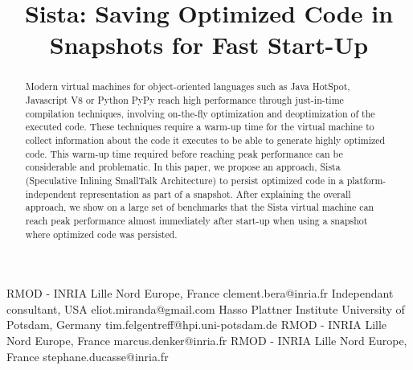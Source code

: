 \documentclass[preprint]{sigplanconf}
\begin{document}
\setlength{\pdfpageheight}{\paperheight}
\setlength{\pdfpagewidth}{\paperwidth}






\title{Sista: Saving Optimized Code in Snapshots for Fast Start-Up}

           {RMOD - INRIA Lille Nord Europe, France}
           {clement.bera@inria.fr}
           {Independant consultant, USA}
           {eliot.miranda@gmail.com}
           {Hasso Plattner Institute University of Potsdam, Germany}
           {tim.felgentreff@hpi.uni-potsdam.de}
           {RMOD - INRIA Lille Nord Europe, France}
           {marcus.denker@inria.fr}
           {RMOD - INRIA Lille Nord Europe, France}
           {stephane.ducasse@inria.fr}

\maketitle

\begin{abstract}
Modern virtual machines for object-oriented languages such as Java HotSpot, Javascript V8 or Python PyPy reach high performance through just-in-time compilation techniques, involving on-the-fly optimization and deoptimization of the executed code. These techniques require a warm-up time for the virtual machine to collect information about the code it executes to be able to generate highly optimized code. This warm-up time required before reaching peak performance can be considerable and problematic. In this paper, we propose an approach, Sista (Speculative Inlining SmallTalk Architecture) to persist optimized code in a platform-independent representation as part of a snapshot. After explaining the overall approach, we show on a large set of benchmarks that the Sista virtual machine can reach peak performance almost immediately after start-up when using a snapshot where optimized code was persisted.
\end{abstract}
\end{document}
